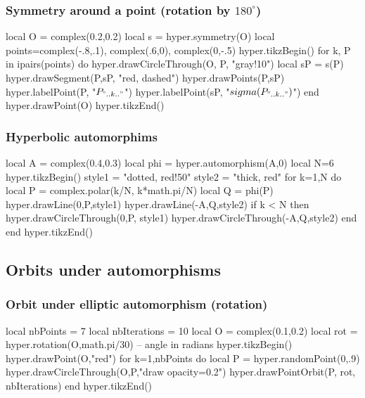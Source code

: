 \documentclass{article}
\begin{document}
\subsubsection{Symmetry around a point (rotation by $180^\circ$)}
\begin{codeandresult}
\begin{luacode*}
local O = complex(0.2,0.2)
local s = hyper.symmetry(O)
local points={complex(-.8,.1), complex(.6,0), complex(0,-.5)}
hyper.tikzBegin()
for k, P in ipairs(points) do
	hyper.drawCircleThrough(O, P, "gray!10")
	local sP = s(P)
	hyper.drawSegment(P,sP, "red, dashed")
	hyper.drawPoints(P,sP)
	hyper.labelPoint(P, "$P_{".. k .."}$")
	hyper.labelPoint(sP, "$\\sigma(P_{".. k .."})$")
end
hyper.drawPoint(O)
hyper.tikzEnd()
\end{luacode*}
\end{codeandresult}


\subsubsection{Hyperbolic automorphims}
\begin{codeandresult}
\begin{luacode*}
local A = complex(0.4,0.3)
local phi = hyper.automorphism(A,0)
local N=6
hyper.tikzBegin()
style1 = "dotted, red!50"
style2 =  "thick, red"
for k=1,N do
	local P = complex.polar(k/N, k*math.pi/N)
	local Q = phi(P)
	hyper.drawLine(0,P,style1)
	hyper.drawLine(-A,Q,style2)
	if k < N then
		hyper.drawCircleThrough(0,P, style1)
		hyper.drawCircleThrough(-A,Q,style2)
	end
end
hyper.tikzEnd()
\end{luacode*}
\end{codeandresult}


\subsection{Orbits under automorphisms}


\subsubsection{Orbit under elliptic automorphism (rotation)}
\begin{codeandresult}
\begin{luacode*}
local nbPoints = 7
local nbIterations = 10
local O = complex(0.1,0.2)
local rot = hyper.rotation(O,math.pi/30) -- angle in radians
hyper.tikzBegin()
hyper.drawPoint(O,"red")
for k=1,nbPoints do
	local P = hyper.randomPoint(0,.9)
	hyper.drawCircleThrough(O,P,"draw opacity=0.2")
	hyper.drawPointOrbit(P, rot, nbIterations) 
end
hyper.tikzEnd()
\end{luacode*}
\end{codeandresult}
\end{document}
